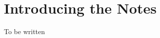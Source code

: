 \documentclass[../../main.tex]{subfiles}
\begin{document}
\chapter*{Introducing the Notes}

To be written

\cite{MATH03-1}
\cite{MATH03-2}
\end{document}

